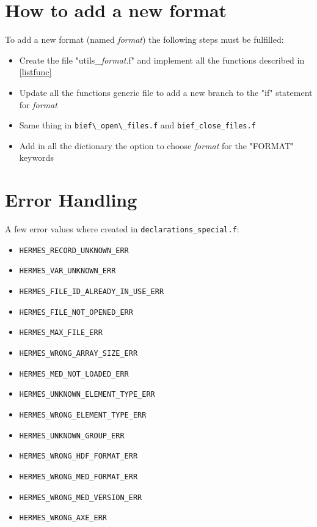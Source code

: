 \section{How to add a new format}
%
To add a new format (named \textit{format}) the following steps must be fulfilled:
\begin{itemize}
\item Create the file "utils\_\textit{format}.f" and implement all the functions
described in \ref{listfunc}
\item Update all the functions generic file to add a new branch to the "if"
statement for \textit{format}
\item Same thing in \verb!bief\_open\_files.f! and \verb!bief_close_files.f!
\item Add in all the dictionary the option to choose \textit{format} for the
"FORMAT" keywords 
\end{itemize}

%
\section{Error Handling}
%
A few error values where created in \verb!declarations_special.f!:
\begin{itemize}
\item \verb!HERMES_RECORD_UNKNOWN_ERR!
\item \verb!HERMES_VAR_UNKNOWN_ERR!
\item \verb!HERMES_FILE_ID_ALREADY_IN_USE_ERR!
\item \verb!HERMES_FILE_NOT_OPENED_ERR!
\item \verb!HERMES_MAX_FILE_ERR!
\item \verb!HERMES_WRONG_ARRAY_SIZE_ERR!
\item \verb!HERMES_MED_NOT_LOADED_ERR!
\item \verb!HERMES_UNKNOWN_ELEMENT_TYPE_ERR!
\item \verb!HERMES_WRONG_ELEMENT_TYPE_ERR!
\item \verb!HERMES_UNKNOWN_GROUP_ERR!
\item \verb!HERMES_WRONG_HDF_FORMAT_ERR!
\item \verb!HERMES_WRONG_MED_FORMAT_ERR!
\item \verb!HERMES_WRONG_MED_VERSION_ERR!
\item \verb!HERMES_WRONG_AXE_ERR!
\end{itemize}


